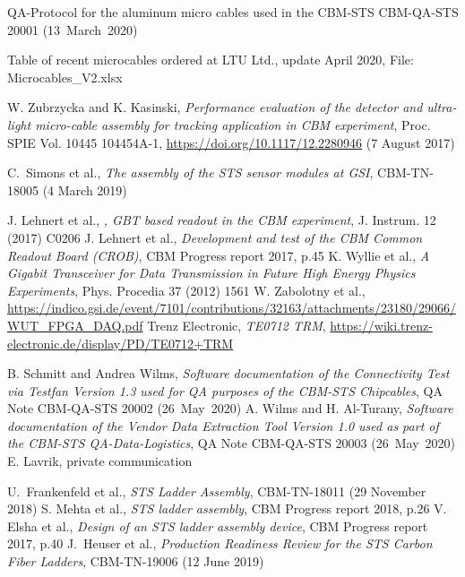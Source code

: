 \begin{thebibliography}{99}
 QA-Protocol for the aluminum micro cables used in the CBM-STS 
CBM-QA-STS 20001 (13~March~2020) 

 Table of recent microcables ordered at LTU Ltd., update April 2020, File: Microcables\_V2.xlsx 

 W. Zubrzycka and K. Kasinski, {\em Performance evaluation of the detector and ultra-light micro-cable assembly for tracking application in CBM experiment}, Proc. SPIE Vol. 10445 104454A-1, \url{https://doi.org/10.1117/12.2280946} (7 August 2017)

 C.~Simons et al., {\em The assembly of the STS sensor modules at GSI}, CBM-TN-18005 (4 March 2019)

       J. Lehnert et al., {\em, GBT based readout in the CBM experiment}, J. Instrum. 12 (2017) C0206 
       J. Lehnert et al., {\em Development and test of the CBM Common Readout Board (CROB)}, CBM Progress report 2017, p.45
       K. Wyllie et al., {\em A Gigabit Transceiver for Data Transmission in Future High Energy Physics Experiments}, Phys. Procedia 37 (2012) 1561
       W. Zabolotny et al., \url{https://indico.gsi.de/event/7101/contributions/32163/attachments/23180/29066/WUT_FPGA_DAQ.pdf}
       Trenz Electronic, {\em TE0712 TRM}, \url{https://wiki.trenz-electronic.de/display/PD/TE0712+TRM}


			 B. Schmitt and Andrea Wilms, {\em Software documentation of the
Connectivity Test via Testfan Version 1.3 used for QA purposes of the CBM-STS Chipcables}, QA Note CBM-QA-STS 20002 (26~May~2020)
			 A. Wilms and H. Al-Turany, {\em Software documentation of the
Vendor Data Extraction Tool Version 1.0 used as part of the CBM-STS QA-Data-Logistics}, QA Note CBM-QA-STS 20003 (26~May~2020)
       E. Lavrik, private communication 


	 U.~Frankenfeld et al., {\em STS Ladder Assembly}, CBM-TN-18011	(29 November 2018)
	 S. Mehta et al., {\em STS ladder assembly}, CBM Progress report 2018, p.26
	V. Elsha et al., {\em Design of an STS ladder assembly device}, CBM Progress report 2017, p.40
	 J.~Heuser et al., {\em Production Readiness Review for the STS Carbon Fiber Ladders}, CBM-TN-19006	(12 June 2019)


\end{thebibliography}
